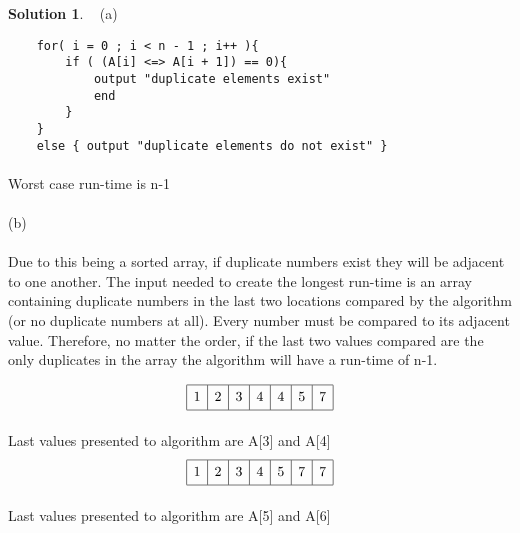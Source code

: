 \documentclass{article}
\theoremstyle{definition}
\newtheorem*{solution}{Solution}
\begin{document}
\begin{solution} 
(a)
\begin{verbatim}
    for( i = 0 ; i < n - 1 ; i++ ){
        if ( (A[i] <=> A[i + 1]) == 0){
            output "duplicate elements exist"
            end
        }
    }
    else { output "duplicate elements do not exist" }
\end{verbatim}
\paragraph{}Worst case run-time is n-1\\ \\ 
(b)
\paragraph{} Due to this being a sorted array, if duplicate numbers exist they will be adjacent to one another. The input needed to create the longest run-time is an array containing duplicate numbers in the last two locations compared by the algorithm (or no duplicate numbers at all). Every number must be compared to its adjacent value. Therefore, no matter the order, if the last two values compared are the only duplicates in the array the algorithm will have a run-time of n-1.

$$ 
\begin{array}{|c|c|c|c|c|c|c|c|}
\hline
\vphantom{\Big|}1&2&3&4&4&5&7 \\
\hline
\end{array}
$$
\paragraph{} Last values presented to algorithm are A[3] and A[4]
$$ 
\begin{array}{|c|c|c|c|c|c|c|c|}
\hline
\vphantom{\Big|}1&2&3&4&5&7&7 \\
\hline
\end{array}
$$
\paragraph{} Last values presented to algorithm are A[5] and A[6]
\end{solution}
\medskip
\goodbreak
\checklist
\end{document}
